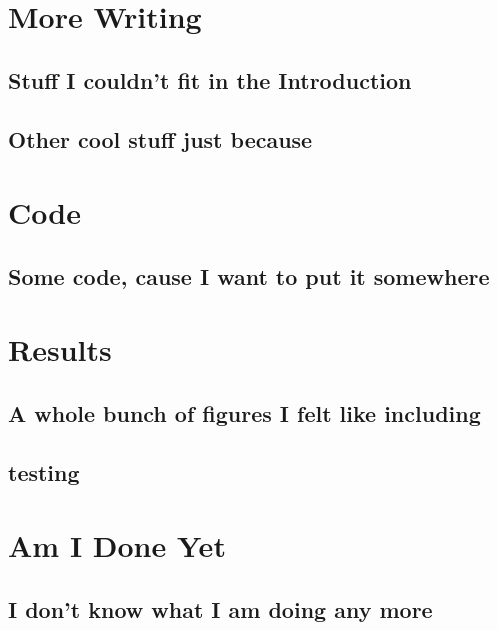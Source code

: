 \backmatter

\chapter{More Writing}

\section{Stuff I couldn't fit in the Introduction}

\section{Other cool stuff just because}

\chapter{Code}

\section{Some code, cause I want to put it somewhere}

\chapter{Results}

\section{A whole bunch of figures I felt like including}
\pagebreak
\section{testing}

\chapter{Am I Done Yet}

\section{I don't know what I am doing any more}

\endbackmatter
